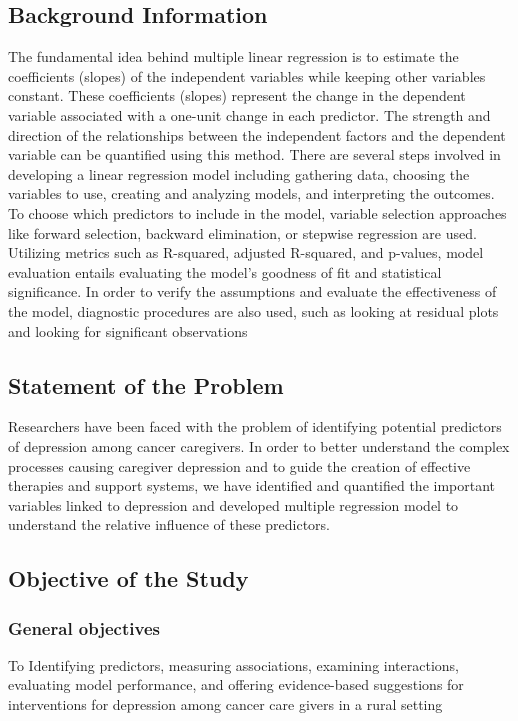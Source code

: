 \documentclass{article}
\numberwithin{equation}{section}
\begin{document}
\subsection{Background Information}
The fundamental idea behind multiple linear regression is to estimate the coefficients (slopes) of the independent variables while keeping other variables constant. These coefficients (slopes) represent the change in the dependent variable associated with a one-unit change in each predictor. The strength and direction of the relationships between the independent factors and the dependent variable can be quantified using this method. There are several steps involved in developing a linear regression model including gathering data, choosing the variables to use, creating and analyzing models, and interpreting the outcomes. To choose which predictors to include in the model, variable selection approaches like forward selection, backward elimination, or stepwise regression are used. Utilizing metrics such as R-squared, adjusted R-squared, and p-values, model evaluation entails evaluating the model's goodness of fit and statistical significance. In order to verify the assumptions and evaluate the effectiveness of the model, diagnostic procedures are also used, such as looking at residual plots and looking for significant observations

\subsection{Statement of the Problem}
Researchers have been faced with the problem of identifying potential predictors of depression among cancer caregivers.  In order to better understand the complex processes causing caregiver depression and to guide the creation of effective therapies and support systems, we have identified and quantified the important variables linked to depression and developed multiple regression model to understand the relative influence of these predictors.

\subsection{Objective of the Study}
\subsubsection{General objectives}
To Identifying predictors, measuring associations, examining interactions, evaluating model performance, and offering evidence-based suggestions for interventions for depression among cancer care givers in a rural setting
\end{document}
